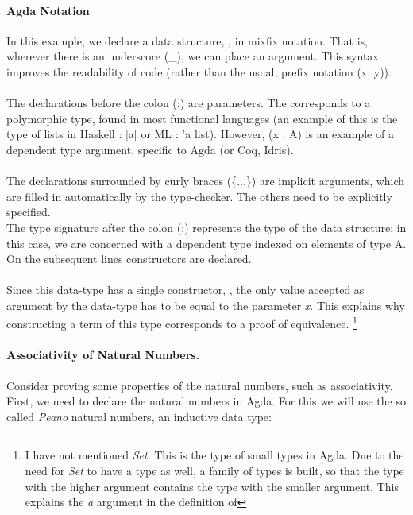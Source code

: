 \documentclass[12pt,twoside,notitlepage]{report}
\begin{document}
\paragraph{Agda Notation}

In this example, we declare a data structure, , in mixfix notation. That is, wherever there is an underscore (\_), we can place an argument. This syntax improves the readability of code (rather than the usual, prefix notation (x, y)).\\\\
The declarations before the colon (:) are parameters. The \AgdaSymbol{\{} \AgdaSymbol{:}  \AgdaSymbol{\}} corresponds to a polymorphic type, found in most functional languages (an example of this is the type of lists in Haskell : [a] or ML : 'a list). However, (x : A) is an example of a dependent type argument, specific to Agda (or Coq, Idris). \\\\
The declarations surrounded by curly braces (\{...\}) are implicit arguments, which are filled in automatically by the type-checker. The others need to be explicitly specified.\\
The type signature after the colon (:) represents the type of the data structure; in this case, we are concerned with a dependent type indexed on elements of type A. On the subsequent lines constructors are declared. \\\\
Since this data-type has a single constructor, , the only value accepted as argument by the data-type has to be equal to the parameter \textit{x}. This explains why constructing a term of this type corresponds to a proof of equivalence. \footnote{I have not mentioned \textit{Set}. This is the type of small types in Agda. Due to the need for \textit{Set} to have a type as well, a family of types is built, so that the type with the higher argument contains the type with the smaller argument. This explains the \textit{a} argument in the definition of }

\paragraph{Associativity of Natural Numbers.}

Consider proving some properties of the natural numbers, such as associativity. First, we need to declare the natural numbers in Agda. For this we will use the so called \textit{Peano} natural numbers, an inductive data type: \\
\end{document}
